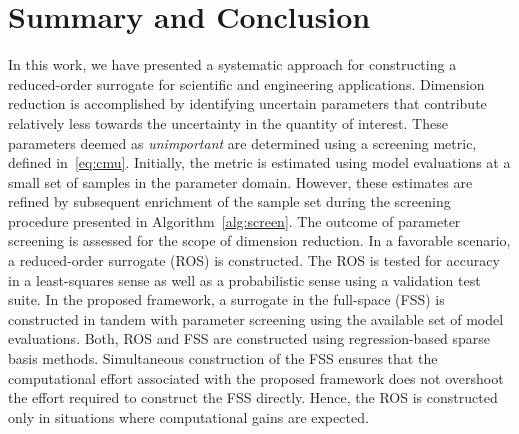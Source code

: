 \section{Summary and Conclusion}
\label{sec:disc}


In this work, we have presented a systematic approach for constructing a reduced-order
surrogate for scientific and engineering applications. Dimension reduction is accomplished
by identifying uncertain parameters that contribute relatively less towards the uncertainty
in the quantity of interest. These parameters deemed as \textit{unimportant} are determined
using a screening metric, defined in~\eqref{eq:cmu}. Initially, the metric is estimated
using model evaluations at a small set of samples in the parameter domain. However, these
estimates are refined by subsequent enrichment of the sample set during the screening
procedure presented in Algorithm~\ref{alg:screen}. The outcome of parameter screening is
assessed for the scope of dimension reduction. In a favorable scenario, a reduced-order
surrogate (ROS) is constructed. The ROS is tested for accuracy in a least-squares sense
as well as a probabilistic sense using a validation test suite. In the proposed framework,
a surrogate in the full-space (FSS) is constructed in tandem with parameter screening using
the available set of model evaluations. Both, ROS and FSS are
constructed using regression-based sparse basis methods. Simultaneous construction
of the FSS ensures that the computational effort associated with the proposed framework
does not overshoot the effort required to construct the FSS directly.
Hence, the ROS is constructed only in situations where computational gains are
expected. 

